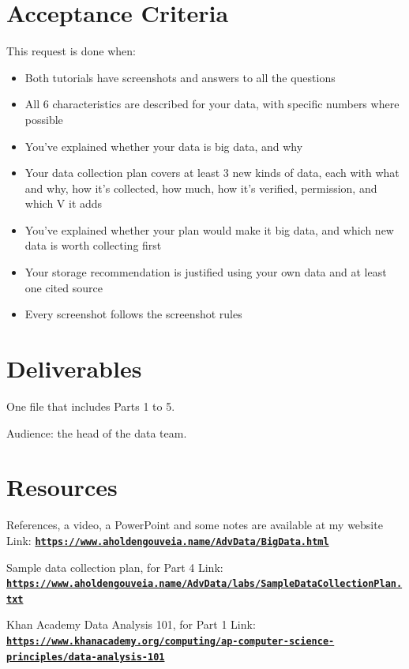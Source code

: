 \documentclass[12pt]{article}
\begin{document}
\section*{Acceptance Criteria}
This request is done when:
\begin{itemize}
    \item Both tutorials have screenshots and answers to all the questions
    \item All 6 characteristics are described for your data, with specific numbers where possible
    \item You've explained whether your data is big data, and why
    \item Your data collection plan covers at least 3 new kinds of data, each with what and why, how it's collected, how much, how it's verified, permission, and which V it adds
    \item You've explained whether your plan would make it big data, and which new data is worth collecting first
    \item Your storage recommendation is justified using your own data and at least one cited source
    \item Every screenshot follows the screenshot rules
\end{itemize}

\section*{Deliverables}
One file that includes Parts 1 to 5.

Audience: the head of the data team.

\section*{Resources}
References, a video, a PowerPoint and some notes are available at my website
Link: \href{https://www.aholdengouveia.name/AdvData/BigData.html}{\textbf{\nolinkurl{https://www.aholdengouveia.name/AdvData/BigData.html}}}

Sample data collection plan, for Part 4
Link: \href{https://www.aholdengouveia.name/AdvData/labs/SampleDataCollectionPlan.txt}{\textbf{\nolinkurl{https://www.aholdengouveia.name/AdvData/labs/SampleDataCollectionPlan.txt}}}

Khan Academy Data Analysis 101, for Part 1
Link: \href{https://www.khanacademy.org/computing/ap-computer-science-principles/data-analysis-101}{\textbf{\nolinkurl{https://www.khanacademy.org/computing/ap-computer-science-principles/data-analysis-101}}}
\end{document}
